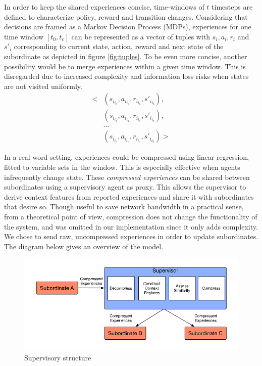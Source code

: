\documentclass[letterpaper]{article}
\begin{document}
In order to keep the shared experiences concise, time-windows of $t$ timesteps are defined to characterize policy, reward and transition changes. Considering that decisions are framed as a Markov Decision Process (MDPs), experiences for one time window $[t_{0}, t_{e}]$ can be represented as a vector of tuples with $s_i, a_i, r_i$ and $s'_i$ corresponding to current state, action, reward and next state of the subordinate as depicted in figure \ref{fig:tuples}. To be even more concise, another possibility would be to merge experiences within a given time window. This is disregarded due to increased complexity and information loss risks when states are not visited uniformly.
\vspace{\baselineskip}
\begin{align*}
 \biggl<
  & (s_{i_{t_0}},a_{i_{t_0}},r_{i_{t_0}},s'_{i_{t_0}}), \\
  & (s_{i_{t_1}},a_{i_{t_1}},r_{i_{t_1}},s'_{i_{t_0}}), \\
  & \hdots                                              \\
  & (s_{i_{t_e}},a_{i_{t_e}},r_{i_{t_e}},s'_{i_{t_0}})
 \biggr>
\end{align*}
\begingroup\vspace*{-\baselineskip}
 \label{fig:tuples}
\vspace*{\baselineskip}\endgroup

In a real word setting, experiences could be compressed using linear regression, fitted to variable sets in the window. This is especially effective when agents infrequently change state. These \textit{compressed experiences} can be shared between subordinates using a supervisory agent as proxy. This allows the supervisor to derive context features from reported experiences and share it with subordinates that desire so. Though useful to save network bandwidth in a practical sense, from a theoretical point of view, compression does not change the functionality of the system, and was omitted in our implementation since it only adds complexity. We chose to send raw, uncompressed experiences in order to update subordinates. The diagram below gives an overview of the model.
\begin{figure}[H]
 \begin{center}
  \includegraphics[width=\linewidth]{figures/diagram}
  \caption{Supervisory structure \citep{garant2015accelerating}}
  \label{fig:diagram}
 \end{center}
\end{figure}
\end{document}
